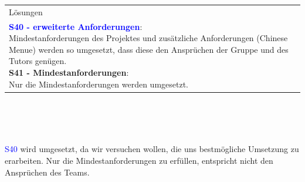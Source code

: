 \documentclass[enabledeprecatedfontcommands,fontsize=11pt,paper=a4,twoside]{scrartcl}
\newcounter{one}
\newcommand{\cb}[1]{{\textcolor{blue}{#1}}}
\begin{document}
\begin{tabular} {|p{8cm} p{8cm}|}
	\multicolumn{2}{|l|}{Lösungen} \\
	\multicolumn{2}{|l|}{\parbox{16cm}{
			\textbf{\cb{\hypertarget{nnn}{S40 - erweiterte Anforderungen}}}: \\
			Mindestanforderungen des Projektes und zusätzliche Anforderungen (Chinese Menue) werden so umgesetzt, dass diese den Ansprüchen der Gruppe und des Tutors genügen. \\
			\textbf{S41 - Mindestanforderungen}: \\
			Nur die Mindestanforderungen werden umgesetzt. \\
	} }\\ [6ex] \hline
\end{tabular}\\ \\ \\
\begin{onehalfspace}
	\cb{S40} wird umgesetzt, da wir versuchen wollen, die uns bestmögliche Umsetzung zu erarbeiten. Nur die Mindestanforderungen zu erfüllen, entspricht nicht den Ansprüchen des Teams.
\end{onehalfspace}
\end{document}
